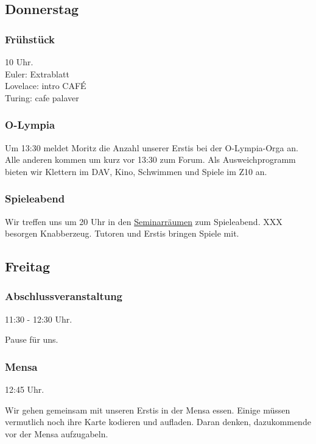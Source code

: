 \documentclass[10pt,ngerman]{scrartcl}
\begin{document}
\begin{multicols}{2}
\subsection{Donnerstag}

\subsubsection{Frühstück}

10 Uhr. \\
Euler: Extrablatt \\
Lovelace: intro CAFÉ \\
Turing: cafe palaver

\subsubsection{O-Lympia}

Um 13:30 meldet Moritz die Anzahl unserer Erstis bei der O-Lympia-Orga
an. Alle anderen kommen um kurz vor 13:30 zum Forum. Als Ausweichprogramm
bieten wir Klettern im DAV, Kino, Schwimmen und Spiele im Z10 an.

\subsubsection{Spieleabend}

Wir treffen uns um 20 Uhr in den \hyperref[rooms]{Seminarräumen} zum Spieleabend.
XXX besorgen Knabberzeug.
Tutoren und Erstis bringen Spiele mit.



\subsection{Freitag}

\subsubsection{Abschlussveranstaltung}

11:30 - 12:30 Uhr.

Pause für uns.

\subsubsection{Mensa}

12:45 Uhr.

Wir gehen gemeinsam mit unseren Erstis in der Mensa essen.
Einige müssen vermutlich noch ihre Karte kodieren und aufladen.
Daran denken, dazukommende vor der Mensa aufzugabeln.


\end{multicols}
\end{document}
